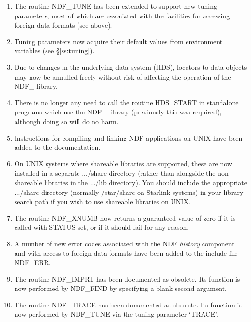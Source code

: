 \documentclass[twoside,11pt]{article}
\newcommand{\htmlref}[2]{#1}
\newcommand{\xref}[3]{#1}
\newcommand{\st}[1]{{\em{#1}}}
\begin{document}
\begin{enumerate}
\item The routine \htmlref{NDF\_TUNE}{NDF_TUNE} has been extended to support new tuning
parameters, most of which are associated with the facilities for
accessing foreign data formats (see above).

\item Tuning parameters now acquire their default values from
environment variables (see \S\ref{ss:tuning}).

\item Due to changes in the underlying data system
(\xref{HDS}{sun92}{}), \xref{locators}{sun92}{using_locators} to
data objects may now be annulled freely without risk of affecting the
operation of the NDF\_ library.

\item There is no longer any need to call the routine \xref{HDS\_START}{sun92}{HDS_START}
in standalone programs which use the NDF\_ library (previously this
was required), although doing so will do no harm.

\item Instructions for compiling and linking NDF applications on
UNIX have been added to the documentation.

\item On UNIX systems where shareable libraries are supported, these
are now installed in a separate .../share directory (rather than
alongside the non-shareable libraries in the .../lib directory). You
should include the appropriate .../share directory (normally
/star/share on Starlink systems) in your library search path if you
wish to use shareable libraries on UNIX.

\item The routine \htmlref{NDF\_XNUMB}{NDF_XNUMB} now returns a guaranteed value of zero if
it is called with STATUS set, or if it should fail for any reason.

\item A number of new error codes associated with the NDF \st{history\/}
component and with access to foreign data formats have been added to
the include file NDF\_ERR.

\item The routine \htmlref{NDF\_IMPRT}{NDF_IMPRT} has been documented as obsolete. Its
function is now performed by \htmlref{NDF\_FIND}{NDF_FIND} by specifying a blank second
argument.

\item The routine \htmlref{NDF\_TRACE}{NDF_TRACE} has been documented as obsolete. Its
function is now performed by NDF\_TUNE via the tuning parameter
`TRACE'.

\end{enumerate}
\end{document}
